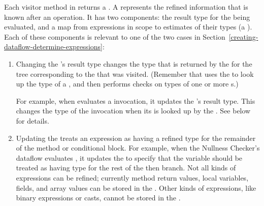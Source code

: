 
\begin{sloppypar}
Each visitor method in 
returns a .  A
 represents the
refined information that is known after an operation.  It has two
components:  the result type for the 
being evaluated, and a map from expressions in scope to estimates of their
types (a ).  Each of these components is
relevant to one of the two cases in
Section~\ref{creating-dataflow-determine-expressions}:
\end{sloppypar}

\begin{enumerate}
\item
\begin{sloppypar}
Changing the 's result type changes
the type that is returned by the 
for the tree corresponding to the  that was
visited.  (Remember that  uses the
 to look up the type of a
, and then performs checks on types of one or more
s.)
\end{sloppypar}

For example, when  evaluates a
 invocation, it updates the
's result type. This changes the
type of the  invocation when its
 is looked up by the
.  See below for details.

\item
Updating the  treats an expression as
having a refined type for the remainder of the method or conditional block. For
example, when the Nullness Checker's dataflow evaluates , it
updates the  to specify that the variable
 should be treated as having type  for the rest of the
then branch.  Not all kinds of expressions can be refined; currently
method return values, local variables, fields, and array values can be stored in
the .  Other kinds of expressions, like
binary expressions or casts, cannot be stored in the
.

\end{enumerate}


